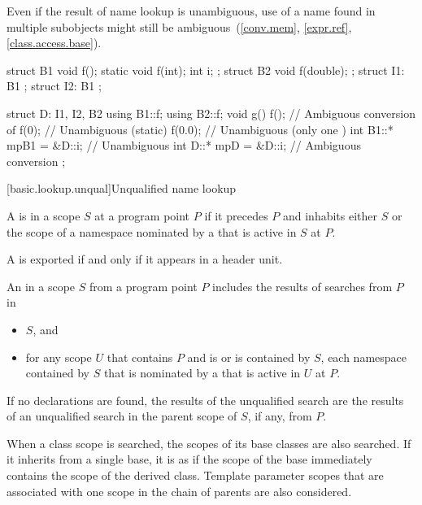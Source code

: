 \pnum
\begin{note}
Even if the result of name lookup is unambiguous, use of a name found in
multiple subobjects might still be
ambiguous~(\ref{conv.mem}, \ref{expr.ref}, \ref{class.access.base}).
\end{note}
\begin{example}
\begin{codeblock}
struct B1 {
  void f();
  static void f(int);
  int i;
};
struct B2 {
  void f(double);
};
struct I1: B1 { };
struct I2: B1 { };

struct D: I1, I2, B2 {
  using B1::f;
  using B2::f;
  void g() {
    f();                        // Ambiguous conversion of 
    f(0);                       // Unambiguous (static)
    f(0.0);                     // Unambiguous (only one )
    int B1::* mpB1 = &D::i;     // Unambiguous
    int D::* mpD = &D::i;       // Ambiguous conversion
  }
};
\end{codeblock}
\end{example}

[basic.lookup.unqual]{Unqualified name lookup}

%

\pnum
A  is
 in a scope $S$ at a program point $P$
if it precedes $P$ and inhabits either $S$ or
the scope of a namespace nominated by a 
that is active in $S$ at $P$.
\begin{note}
A  is exported if and only if
it appears in a header unit.
\end{note}

\pnum
An  in a scope $S$ from a program point $P$
includes the results of searches from $P$ in
\begin{itemize}
\item
$S$, and
\item
for any scope $U$ that contains $P$ and is or is contained by $S$,
each namespace contained by $S$ that is nominated by
a  that is active in $U$ at $P$.
\end{itemize}
If no declarations are found,
the results of the unqualified search are
the results of an unqualified search in the parent scope of $S$, if any,
from $P$.
\begin{note}
When a class scope is searched,
the scopes of its base classes are also searched.
If it inherits from a single base,
it is as if the scope of the base immediately contains
the scope of the derived class.
Template parameter scopes
that are associated with one scope in the chain of parents
are also considered.
\end{note}

